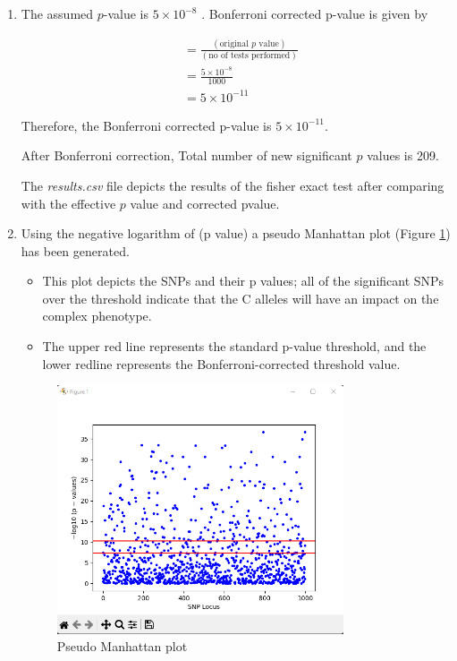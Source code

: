 \documentclass[12pt, oneside]{article}   	%
\begin{document}
\begin{enumerate}
\item The assumed $p$-value is $5 \times 10^{-8}$ . Bonferroni corrected p-value is given by

\begin{align*}
&= \frac{(\text{original } p \text{ value})}{(\text{no of tests performed})}\\
&= \frac{5 \times 10^{-8}}{1000}\\
&= 5 \times 10^{-11}
\end{align*}

Therefore, the Bonferroni corrected p-value is $5 \times 10^{-11}$.

After Bonferroni correction, Total number of new significant $p$ values is 209.

The \emph{results.csv} file depicts the results of the fisher exact test after comparing with the  effective $p$ value and corrected pvalue.

\item Using the negative logarithm of (p value) a pseudo Manhattan plot (Figure \ref{fig:mesh1}) has been generated.

\begin{itemize}
\item This plot depicts the SNPs and their p values; all of the significant SNPs over the threshold indicate that the C alleles will have an impact on the complex phenotype.

\item The upper red line represents the standard p-value threshold, and the lower redline represents the Bonferroni-corrected threshold value.
\end{itemize}

\newpage
\thispagestyle{empty}

\begin{figure}[!h]
\centering
\begin{minipage}[c]{1\textwidth}
    \centering
    \includegraphics[width=0.8\textwidth]{image1}
    \caption{\footnotesize{Pseudo Manhattan plot}}
    \label{fig:mesh1}
\end{minipage}
\end{figure}

\end{enumerate}
\end{document}
